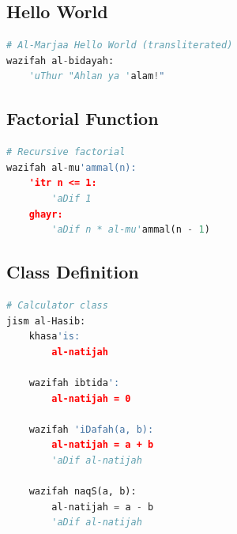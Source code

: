 \documentclass[11pt,a4paper]{article}
\begin{document}
\subsection{Hello World}

\begin{lstlisting}[language=Python, caption=Hello World in Al-Marjaa]
# Al-Marjaa Hello World (transliterated)
wazifah al-bidayah:
    'uThur "Ahlan ya 'alam!"
\end{lstlisting}

\subsection{Factorial Function}

\begin{lstlisting}[language=Python, caption=Factorial in Al-Marjaa]
# Recursive factorial
wazifah al-mu'ammal(n):
    'itr n <= 1:
        'aDif 1
    ghayr:
        'aDif n * al-mu'ammal(n - 1)
\end{lstlisting}

\subsection{Class Definition}

\begin{lstlisting}[language=Python, caption=Object-Oriented Example]
# Calculator class
jism al-Hasib:
    khasa'is:
        al-natijah
    
    wazifah ibtida':
        al-natijah = 0
    
    wazifah 'iDafah(a, b):
        al-natijah = a + b
        'aDif al-natijah
    
    wazifah naqS(a, b):
        al-natijah = a - b
        'aDif al-natijah
\end{lstlisting}
\end{document}

